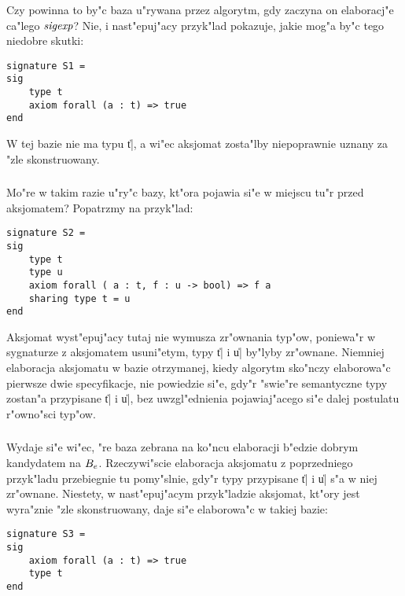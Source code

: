\subsubsection{\secmodest}
\label{sec:modest}

Czy powinna to by"c baza u"rywana przez algorytm,
gdy zaczyna on elaboracj"e ca"lego ${\it sigexp}$?
Nie, i nast"epuj"acy przyk"lad pokazuje, jakie mog"a by"c tego niedobre skutki:
\begin{verbatim}
signature S1 =
sig
    type t
    axiom forall (a : t) => true
end
\end{verbatim}
W tej bazie nie ma typu \|t|, a wi"ec aksjomat zosta"lby niepoprawnie uznany za "zle skonstruowany.

\subsubsection{\secignorant}
\label{sec:ignorant}

Mo"re w takim razie u"ry"c bazy, kt"ora pojawia si"e w miejscu tu"r przed aksjomatem?
Popatrzmy na przyk"lad:
\begin{verbatim}
signature S2 =
sig
    type t
    type u 
    axiom forall ( a : t, f : u -> bool) => f a
    sharing type t = u
end
\end{verbatim}
Aksjomat wyst"epuj"acy tutaj nie wymusza zr"ownania typ"ow,
poniewa"r w sygnaturze z aksjomatem usuni"etym, typy \|t| i \|u| by"lyby zr"ownane.
Niemniej elaboracja aksjomatu w bazie otrzymanej, kiedy algorytm
sko"nczy elaborowa"c pierwsze dwie specyfikacje, nie powiedzie si"e,
gdy"r "swie"re semantyczne typy zostan"a przypisane \|t| i \|u|,
bez uwzgl"ednienia pojawiaj"acego si"e dalej postulatu r"owno"sci typ"ow.

\subsubsection{\secomniscient}
\label{sec:omniscient}

Wydaje si"e wi"ec, "re baza zebrana na ko"ncu elaboracji b"edzie dobrym kandydatem na $B_e$.
Rzeczywi"scie elaboracja aksjomatu z poprzedniego przyk"ladu przebiegnie
tu pomy"slnie, gdy"r typy przypisane \|t| i \|u| s"a w niej zr"ownane.
Niestety, w nast"epuj"acym przyk"ladzie aksjomat, kt"ory jest wyra"znie
"zle skonstruowany, daje si"e elaborowa"c w takiej bazie:
\begin{verbatim}
signature S3 =
sig
    axiom forall (a : t) => true
    type t
end
\end{verbatim}

